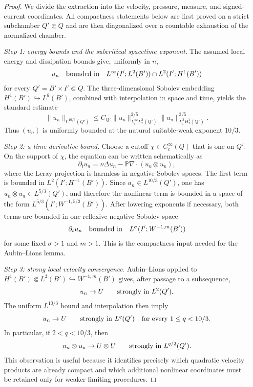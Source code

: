 \documentclass[11pt]{article}
\theoremstyle{definition}\newtheorem{problem}[theorem]{Problem}
\theoremstyle{definition}
\theoremstyle{remark}
\begin{document}
\begin{proof}
We divide the extraction into the velocity, pressure, measure, and signed-current
coordinates.  All compactness statements below are first proved on a strict
subchamber \(Q'\Subset Q\) and are then diagonalized over a countable exhaustion
of the normalized chamber.

\emph{Step 1: energy bounds and the subcritical spacetime exponent.}
The assumed local energy and dissipation bounds give, uniformly in \(n\),
\[
 u_n\quad\hbox{bounded in}\quad
 L^\infty(I';L^2(B'))\cap L^2(I';H^1(B'))
\]
for every \(Q'=B'\times I'\Subset Q\).  The three-dimensional Sobolev
embedding \(H^1(B')\hookrightarrow L^6(B')\), combined with interpolation in
space and time, yields the standard estimate
\[
 \|u_n\|_{L^{10/3}(Q')}
 \le C_{Q'}
 \|u_n\|_{L^\infty_tL^2_x(Q')}^{2/5}
 \|u_n\|_{L^2_tH^1_x(Q')}^{3/5}.
\]
Thus \((u_n)\) is uniformly bounded at the natural suitable-weak exponent
\(10/3\).

\emph{Step 2: a time-derivative bound.}
Choose a cutoff \(\chi\in C_c^\infty(Q)\) that is one on \(Q'\).  On the support
of \(\chi\), the equation can be written schematically as
\[
 \partial_t u_n
 =\nu\Delta u_n-\mathbb P\nabla\!\cdot(u_n\otimes u_n),
\]
where the Leray projection is harmless in negative Sobolev spaces.  The first
term is bounded in \(L^2(I';H^{-1}(B'))\).  Since
\(u_n\in L^{10/3}(Q')\), one has
\(u_n\otimes u_n\in L^{5/3}(Q')\), and therefore the nonlinear term is bounded
in a space of the form
\(L^{5/3}(I';W^{-1,5/3}(B'))\).  After lowering exponents if necessary, both
terms are bounded in one reflexive negative Sobolev space
\[
 \partial_tu_n\quad\hbox{bounded in}\quad
 L^\sigma(I';W^{-1,m}(B'))
\]
for some fixed \(\sigma>1\) and \(m>1\).  This is the compactness input needed
for the Aubin--Lions lemma.

\emph{Step 3: strong local velocity convergence.}
Aubin--Lions applied to
\(H^1(B')\Subset L^2(B')\hookrightarrow W^{-1,m}(B')\) gives, after passage to
a subsequence,
\[
 u_n\to U\qquad\hbox{strongly in }L^2(Q').
\]
The uniform \(L^{10/3}\) bound and interpolation then imply
\[
 u_n\to U\qquad\hbox{strongly in }L^q(Q')
 \quad\text{for every }1\le q<10/3.
\]
In particular, if \(2<q<10/3\), then
\[
 u_n\otimes u_n\to U\otimes U
 \qquad\hbox{strongly in }L^{q/2}(Q').
\]
This observation is useful because it identifies precisely which quadratic
velocity products are already compact and which additional nonlinear
coordinates must be retained only for weaker limiting procedures.


\end{proof}
\end{document}
